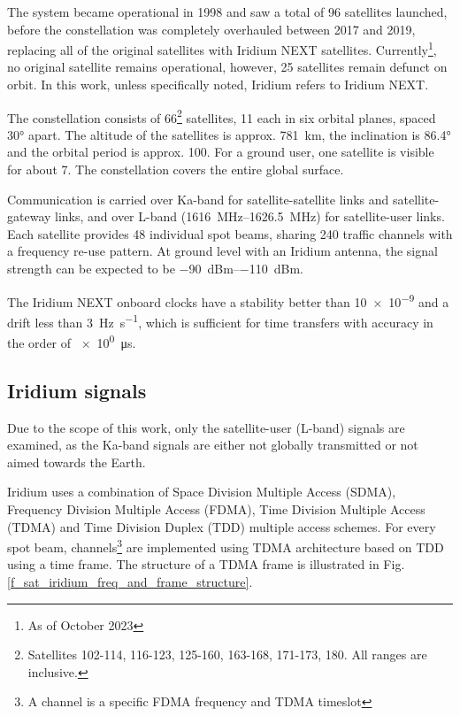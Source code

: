 The system became operational in 1998 and saw a total of 96 satellites launched, before the constellation was completely overhauled between 2017 and 2019, replacing all of the original satellites with Iridium NEXT satellites. Currently\footnote{As of October 2023}, no original satellite remains operational, however, 25 satellites remain defunct on orbit\cite{sat06}. In this work, unless specifically noted, Iridium refers to Iridium NEXT.

The constellation consists of 66\footnote{Satellites 102-114, 116-123, 125-160, 163-168, 171-173, 180. All ranges are inclusive.} satellites, 11 each in six orbital planes, spaced \ang{30} apart. The altitude of the satellites is approx. \qty{781}{\km}, the inclination is \ang{86.4} and the orbital period is approx. \qty{100}{\min}. For a ground user, one satellite is visible for about \qty{7}{\min}. The constellation covers the entire global surface\cite{sat01}.

Communication is carried over Ka-band for satellite-satellite links and satellite-gateway links, and over L-band (\qtyrange{1616}{1626.5}{\mega\hertz}) for satellite-user links. Each satellite provides 48 individual spot beams, sharing 240 traffic channels with a frequency re-use pattern\cite{sat07}. At ground level with an Iridium antenna, the signal strength can be expected to be \qtyrange{-90}{-110}{dBm}\cite{sop01}.

The Iridium NEXT onboard clocks have a stability better than \num{10e-9} and a drift less than \qty{3}{\hertz\per\s}, which is sufficient for time transfers with accuracy in the order of \qty{e0}{\micro\s}\cite{sop11}.

\subsection{Iridium signals}
\label{s_sat_iridium_signals}
Due to the scope of this work, only the satellite-user (L-band) signals are examined, as the Ka-band signals are either not globally transmitted or not aimed towards the Earth.

Iridium uses a combination of Space Division Multiple Access (SDMA),  Frequency Division Multiple Access (FDMA), Time Division Multiple Access (TDMA) and Time Division Duplex (TDD) multiple access schemes\cite{sop11}. For every spot beam, channels\footnote{A channel is a specific FDMA frequency and TDMA timeslot\cite{sat07}} are implemented using TDMA architecture based on TDD using a time frame\cite{sop12}. The structure of a TDMA frame is illustrated in Fig. \ref{f_sat_iridium_freq_and_frame_structure}.

